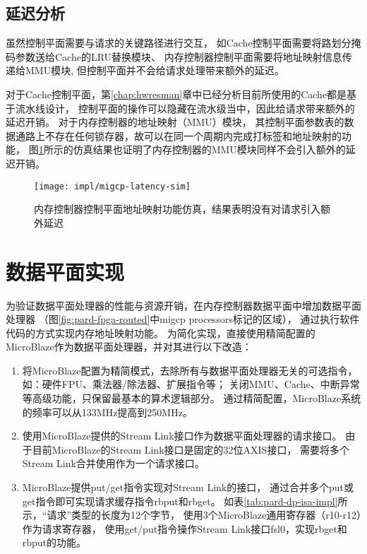 \subsection{延迟分析}

虽然控制平面需要与请求的关键路径进行交互，
如Cache控制平面需要将路划分掩码参数送给Cache的LRU替换模块、
内存控制器控制平面需要将地址映射信息传递给MMU模块,
但控制平面并不会给请求处理带来额外的延迟。

对于Cache控制平面，第\ref{chap:hwresman}章中已经分析目前所使用的Cache都是基于流水线设计，
控制平面的操作可以隐藏在流水级当中，因此给请求带来额外的延迟开销。
对于内存控制器的地址映射（MMU）模块，
其控制平面参数表的数据通路上不存在任何锁存器，故可以在同一个周期内完成打标签和地址映射的功能，
图\ref{fig:migcp-latency-sim}所示的仿真结果也证明了内存控制器的MMU模块同样不会引入额外的延迟开销。

\begin{figure}[htb]
  \centering
  \texttt{[image: impl/migcp-latency-sim]}
  \caption[内存控制器控制平面地址映射功能仿真]{内存控制器控制平面地址映射功能仿真，结果表明没有对请求引入额外延迟}
  \label{fig:migcp-latency-sim}
\end{figure}


\section{数据平面实现}

为验证数据平面处理器的性能与资源开销，在内存控制器数据平面中增加数据平面处理器
（图\ref{fig:pard-fpga-routed}中migcp processors标记的区域），
通过执行软件代码的方式实现内存地址映射功能。
为简化实现，直接使用精简配置的MicroBlaze作为数据平面处理器，并对其进行以下改造：

\begin{enumerate}[leftmargin=2\parindent, nolistsep, label=\arabic*）]
  \item 将MicroBlaze配置为精简模式，去除所有与数据平面处理器无关的可选指令，
        如：硬件FPU、乘法器/除法器、扩展指令等；
        关闭MMU、Cache、中断异常等高级功能，只保留最基本的算术逻辑部分。
        通过精简配置，MicroBlaze系统的频率可以从133MHz提高到250MHz。
  \item 使用MicroBlaze提供的Stream Link接口作为数据平面处理器的请求接口。
        由于目前MicroBlaze的Stream Link接口是固定的32位AXIS接口，
        需要将多个Stream Link合并使用作为一个请求接口。
  \item MicroBlaze提供put/get指令实现对Stream Link的接口，
        通过合并多个put或get指令即可实现请求缓存指令rbput和rbget。
        如表\ref{tab:pard-dp-isa-impl}所示，``请求''类型的长度为12个字节，
        使用3个MicroBlaze通用寄存器（r10-r12）作为请求寄存器，
        使用get/put指令操作Stream Link接口fsl0，实现rbget和rbput的功能。
\end{enumerate}

